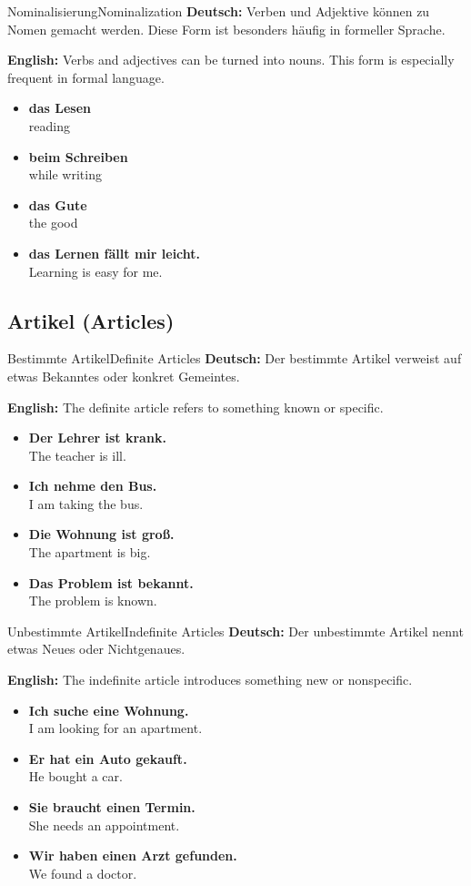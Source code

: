 \documentclass[a4paper,11pt]{article}
\newcommand{\GermanText}[1]{\textbf{Deutsch: }#1\par}
\newcommand{\EnglishText}[1]{{\color{SoftGray}\textbf{English: }#1\par}}
\newcommand{\ExampleItem}[2]{\item \textbf{#1}\\{\color{SoftGray}#2}}
\begin{document}
\begin{grammarentry}{Nominalisierung}{Nominalization}
    \GermanText{Verben und Adjektive können zu Nomen gemacht werden. Diese Form ist besonders häufig in formeller Sprache.}
    \EnglishText{Verbs and adjectives can be turned into nouns. This form is especially frequent in formal language.}
    \begin{exbox}
        \begin{itemize}
            \ExampleItem{das Lesen}{reading}
            \ExampleItem{beim Schreiben}{while writing}
            \ExampleItem{das Gute}{the good}
            \ExampleItem{das Lernen fällt mir leicht.}{Learning is easy for me.}
        \end{itemize}
    \end{exbox}
\end{grammarentry}

\subsection{Artikel {\small (Articles)}}

\begin{grammarentry}{Bestimmte Artikel}{Definite Articles}
    \GermanText{Der bestimmte Artikel verweist auf etwas Bekanntes oder konkret Gemeintes.}
    \EnglishText{The definite article refers to something known or specific.}
    \begin{exbox}
        \begin{itemize}
            \ExampleItem{Der Lehrer ist krank.}{The teacher is ill.}
            \ExampleItem{Ich nehme den Bus.}{I am taking the bus.}
            \ExampleItem{Die Wohnung ist groß.}{The apartment is big.}
            \ExampleItem{Das Problem ist bekannt.}{The problem is known.}
        \end{itemize}
    \end{exbox}
\end{grammarentry}

\begin{grammarentry}{Unbestimmte Artikel}{Indefinite Articles}
    \GermanText{Der unbestimmte Artikel nennt etwas Neues oder Nichtgenaues.}
    \EnglishText{The indefinite article introduces something new or nonspecific.}
    \begin{exbox}
        \begin{itemize}
            \ExampleItem{Ich suche eine Wohnung.}{I am looking for an apartment.}
            \ExampleItem{Er hat ein Auto gekauft.}{He bought a car.}
            \ExampleItem{Sie braucht einen Termin.}{She needs an appointment.}
            \ExampleItem{Wir haben einen Arzt gefunden.}{We found a doctor.}
        \end{itemize}
    \end{exbox}
\end{grammarentry}
\end{document}
